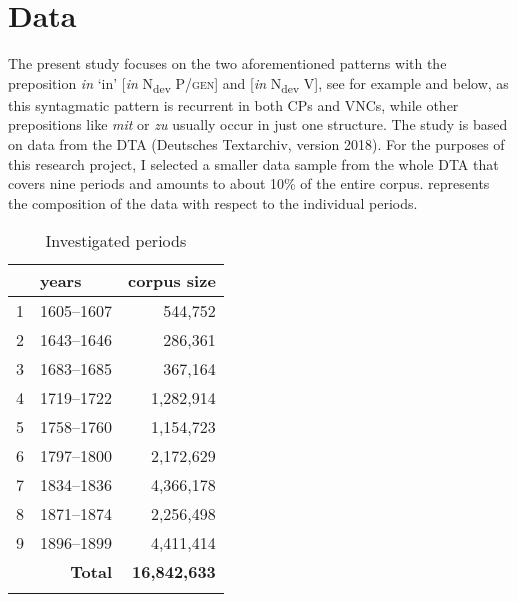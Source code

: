 \documentclass[output=paper,colorlinks,citecolor=brown]{langscibook}
\begin{document}
\section{Data}\label{sec:fleissner:3} 

The present study focuses on the two aforementioned patterns with the preposition \textit{in} ‘in' [\textit{in} N\textsubscript{dev} P/\textsc{gen}] and [\textit{in} N\textsubscript{dev} V], see for example  and  below, as this syntagmatic pattern is recurrent in both CPs and VNCs, while other prepositions like \textit{mit} or \textit{zu} usually occur in just one structure. The study is based on data from the DTA (Deutsches Textarchiv, version 2018). For the purposes of this research project, I selected a smaller data sample from the whole DTA that covers nine periods and amounts to about 10\% of the entire corpus.  represents the composition of the data with respect to the individual periods. 

\begin{table}
\begin{tabularx}{0.5\textwidth}{lrr}
\lsptoprule
 \multicolumn{1}{l}{period} &  \multicolumn{1}{l}{years} &  \multicolumn{1}{l}{corpus size}\\
 \midrule
 {1} & 1605–1607 & 544,752\\
 {2} & 1643–1646 & 286,361\\
 {3} & 1683–1685 & 367,164\\
 {4} & 1719–1722 & 1,282,914\\
 {5} & 1758–1760 & 1,154,723\\
 {6} & 1797–1800 & 2,172,629\\
 {7} & 1834–1836 & 4,366,178\\
 {8} & 1871–1874 & 2,256,498\\
 {9} & 1896–1899 & 4,411,414\\
 \midrule
 &{{\textbf{Total}}} & \textbf{16,842,633}\\
\lspbottomrule
\end{tabularx}
\caption{Investigated periods}
\label{tab:fleissner:1}
\end{table}
\end{document}
